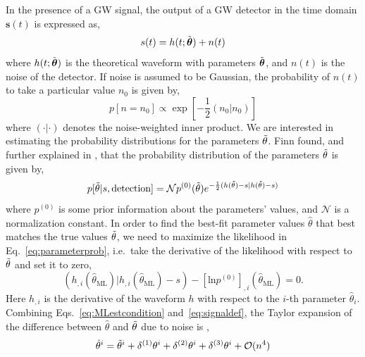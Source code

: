 \documentclass[a4paper,12pt]{article}
\begin{document}
In the presence of a GW signal, the output of a GW detector in the time domain $\boldsymbol{s}(t)$ is expressed as,
\begin{equation}
s(t)=h(t;\Tilde{\boldsymbol{\theta}})+n(t)
\label{eq:signaldef}
\end{equation}
where $h(t;\Tilde{\boldsymbol{\theta}})$ is the theoretical waveform with parameters $\Tilde{\boldsymbol{\theta}}$, and $n(t)$ is the noise of the detector. If noise is assumed to be Gaussian, the probability of $n(t)$ to take a particular value $n_{0}$ is given by,
\begin{equation}
p[n=n_{0}] \propto 
\exp\left[-\frac{1}{2}(n_{0}|n_{0})\right]
\label{eq:gaussnoise}
\end{equation}
where $(\cdot|\cdot)$ denotes the noise-weighted inner product. We are interested in estimating the probability distributions for the parameters $\Tilde{\theta}$. Finn \cite{finn1992detection} found, and further explained in \cite{cutler1994gravitational}, that the probability distribution of the parameters $\Tilde{\theta}$ is given by, 
\begin{equation}
p[\Tilde{\theta}|s,\text{detection}]=\mathcal{N} p^{(0)}(\Tilde{\theta}) e^{-\frac{1}{2}(h(\Tilde{\theta})-s|h(\Tilde{\theta})-s)}
\label{eq:parameterprob}
\end{equation}
where $p^{(0)}$ is some prior information about the parameters' values, and $\mathcal{N}$ is a normalization constant.
In order to find the best-fit parameter values $\hat{\theta}$ that best matches the true values $\Tilde{\theta}$, we need to maximize the likelihood in Eq.~\eqref{eq:parameterprob}, i.e.\ take the derivative of the likelihood with respect to $\Tilde{\theta}$ and set it to zero,
\begin{equation}
(h_{,i}(\hat{\theta}_{\text{ML}})|h_{,i}(\hat{\theta}_{\text{ML}}) - s) - [\text{ln}p^{(0)}]_{,i}(\hat{\theta}_{\text{ML}})= 0 .
\label{eq:MLestcondition}
\end{equation}
Here $h_{,i}$ is the derivative of the waveform $h$ with respect to the $i$-th parameter $\hat{\theta}_{i}$. Combining Eqs.~\eqref{eq:MLestcondition} and~\eqref{eq:signaldef}, the Taylor expansion of the difference between $\hat{\theta}$ and $\Tilde{\theta}$ due to noise is \cite{cutler1994gravitational},
\begin{equation}
\hat{\theta}^{i} = \Tilde{\theta}^{i} + \delta^{(1)}\theta^{i} + \delta^{(2)}\theta^{i} + \delta^{(3)}\theta^{i} + \mathcal{O}(n^{4})
\label{eq:expansiontheta}
\end{equation}
\end{document}
